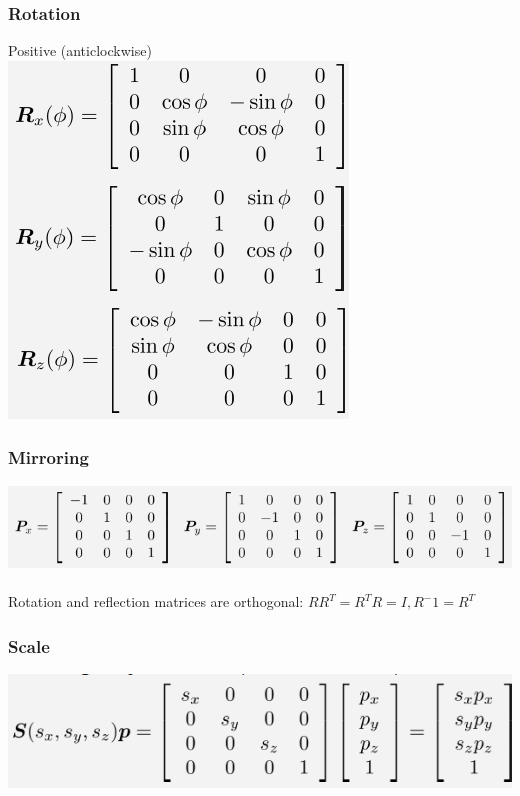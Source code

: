 \documentclass{article}
\begin{document}
\subsubsection{Rotation}
Positive (anticlockwise)\\
\includegraphics[scale=0.6]{image28.png}\\
\subsubsection{Mirroring}
\includegraphics[scale=0.6]{image29.png}\\\\
Rotation and reflection matrices are orthogonal: $RR^T=R^TR=I, R^-1=R^T$
\subsubsection{Scale}
\includegraphics[scale=0.6]{image30.png}\\\\
\end{document}
